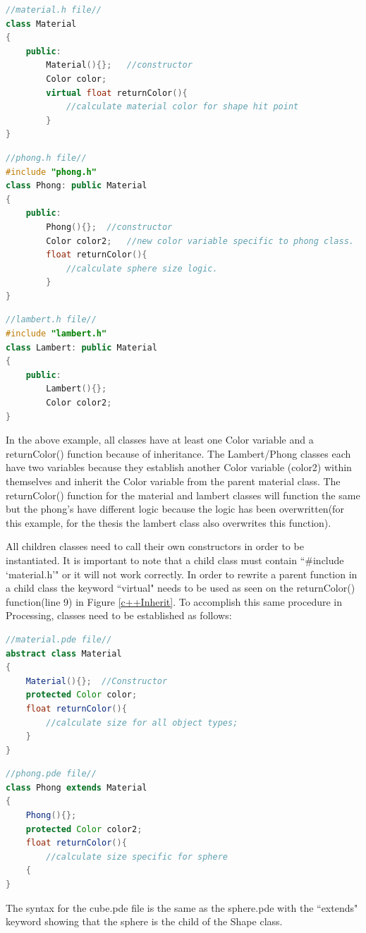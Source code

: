 \singlespacing
\begin{lstlisting}[language=C++, style=mystyle, label=c++Inherit]
//material.h file//
class Material
{
    public:
        Material(){};   //constructor
        Color color;
        virtual float returnColor(){
            //calculate material color for shape hit point
        }
}
\end{lstlisting}
\begin{lstlisting}[language=C++, style=mystyle]
//phong.h file//
#include "phong.h"
class Phong: public Material
{
    public:
        Phong(){};  //constructor
        Color color2;   //new color variable specific to phong class.
        float returnColor(){
            //calculate sphere size logic.
        }
}
\end{lstlisting}
\begin{lstlisting}[language=C++, caption=C++ Inheritance Example, style=mystyle]
//lambert.h file//
#include "lambert.h"
class Lambert: public Material
{
    public:
        Lambert(){};
        Color color2;
}
\end{lstlisting}
\doublespacing

In the above example, all classes have at least one Color variable and a returnColor() function because of inheritance. The Lambert/Phong classes each have two variables because they establish another Color variable (color2) within themselves and inherit the Color variable from the parent material class.  The returnColor() function for the material and lambert classes will function the same but the phong's have different logic because the logic has been overwritten(for this example, for the thesis the lambert class also overwrites this function).

All children classes need to call their own constructors in order to be instantiated.  It is important to note that a child class must contain ``\#include `material.h'" or it will not work correctly. In order to rewrite a parent function in a child class the keyword ``virtual" needs to be used as seen on the returnColor() function(line 9) in Figure \ref{c++Inherit}.  To accomplish this same procedure in Processing, classes need to be established as follows:

\singlespacing
\begin{lstlisting}[language=Java, style=mystyle]
//material.pde file//
abstract class Material
{
    Material(){};  //Constructor
    protected Color color;
    float returnColor(){
        //calculate size for all object types;
    }
}
\end{lstlisting}
\begin{lstlisting}[language=Java, caption=Java Abstract Class Example, style=mystyle, label=javaInherit]
//phong.pde file//
class Phong extends Material
{
    Phong(){};
    protected Color color2;
    float returnColor(){
        //calculate size specific for sphere
    {
}
\end{lstlisting}
\doublespacing
The syntax for the cube.pde file is the same as the sphere.pde with the ``extends" keyword showing that the sphere is the child of the Shape class.

